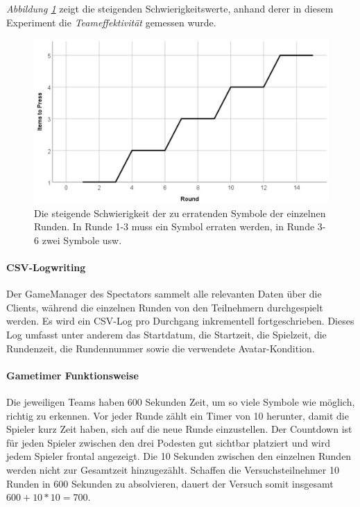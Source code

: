 \documentclass[a4paper,11pt]{article}%
\renewcommand{\\}{\vspace*{0.5\baselineskip} \newline}
\begin{document}
{\textit{Abbildung \ref{RoundDifficulty}} zeigt die steigenden Schwierigkeitswerte, anhand derer in diesem Experiment die \textit{Teameffektivität} gemessen wurde.

\begin{figure}[H]
		\begin{footnotesize}
		\centering
			\includegraphics[scale=0.4]{Abbildungen/RoundDifficulty.JPG}	
			\caption[Der Schwierigkeitsgrad der Runden]{Die steigende Schwierigkeit der zu erratenden Symbole der einzelnen Runden. In Runde 1-3 muss ein Symbol erraten werden, in Runde 3-6 zwei Symbole usw.}
			\label{RoundDifficulty}
		\end{footnotesize}
	\end{figure}

\paragraph{CSV-Logwriting}
Der GameManager des Spectators sammelt alle relevanten Daten über die Clients, während die einzelnen Runden von den Teilnehmern durchgespielt werden. Es wird ein CSV-Log pro Durchgang inkrementell fortgeschrieben. Dieses Log umfasst unter anderem das Startdatum, die Startzeit, die Spielzeit, die Rundenzeit, die Rundennummer sowie die verwendete Avatar-Kondition.

\paragraph{Gametimer Funktionsweise}
Die jeweiligen Teams haben 600 Sekunden Zeit, um so viele Symbole wie möglich, richtig zu erkennen. Vor jeder Runde zählt ein Timer von 10 herunter, damit die Spieler kurz Zeit haben, sich auf die neue Runde einzustellen. Der Countdown ist für jeden Spieler zwischen den drei Podesten gut sichtbar platziert und wird jedem Spieler frontal angezeigt. Die 10 Sekunden zwischen den einzelnen Runden werden nicht zur Gesamtzeit hinzugezählt. Schaffen die Versuchsteilnehmer 10 Runden in 600 Sekunden zu absolvieren, dauert der Versuch somit insgesamt \\
$600 + 10 * 10 = 700$.

}
\end{document}
